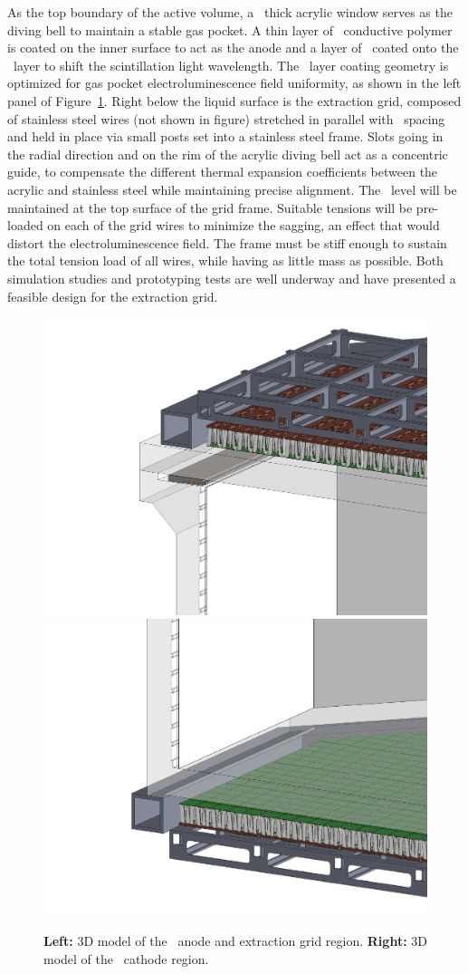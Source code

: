 As the top boundary of the active volume, a \DSkPMMATPCThickness\ thick acrylic window serves as the diving bell to maintain a stable gas pocket. A thin layer of \Clevios\ conductive polymer is coated on the inner surface to act as the anode and a layer of \TPB\ coated onto the \Clevios\ layer to shift the scintillation light wavelength. The \Clevios\ layer coating geometry is optimized for gas pocket electroluminescence field uniformity, as shown in the left panel of Figure~\ref{fig:TPC_anode_cathode}. Right below the liquid surface is the extraction grid, composed of stainless steel wires (not shown in figure) stretched in parallel with \DSkWirePitch\ spacing and held in place via small posts set into a stainless steel frame. Slots going in the radial direction and on the rim of the acrylic diving bell act as a concentric guide, to compensate the different thermal expansion coefficients between the acrylic and stainless steel while maintaining precise alignment.  The \LAr\ level will be maintained at the top surface of the grid frame.  Suitable tensions will be pre-loaded on each of the grid wires to minimize the sagging, an effect that would distort the electroluminescence field. The frame must be stiff enough to sustain the total tension load of all wires, while having as little mass as possible. Both simulation studies and prototyping tests are well underway and have presented a feasible design for the extraction grid.

\begin{figure}[t!]
\centering
\includegraphics[width=0.49\columnwidth]{./Figures/TPC-anode.PDF}
\includegraphics[width=0.49\columnwidth]{./Figures/TPC-cathode.PDF}
\caption[\DSks\ \LArTPC\ anode and cathode regions]{{\bf Left:} 3D model of the \LArTPC\ anode and extraction grid region.  {\bf Right:} 3D model of the \LArTPC\ cathode region.}
\label{fig:TPC_anode_cathode}
\end{figure}

